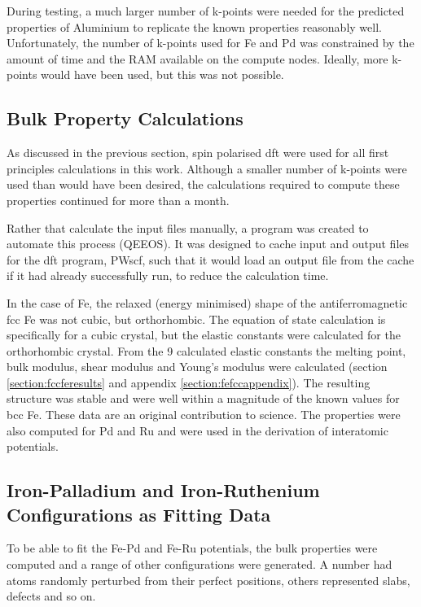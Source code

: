 During testing, a much larger number of k-points were needed for the predicted properties of Aluminium to replicate the known properties reasonably well.  Unfortunately, the number of k-points used for Fe and Pd was constrained by the amount of time and the RAM available on the compute nodes.  Ideally, more k-points would have been used, but this was not possible.


\subsection{Bulk Property Calculations}

As discussed in the previous section, spin polarised \acrshort{dft} were used for all first principles calculations in this work.  Although a smaller number of k-points were used than would have been desired, the calculations required to compute these properties continued for more than a month.

Rather that calculate the input files manually, a program was created to automate this process (QEEOS).  It was designed to cache input and output files for the \acrshort{dft} program, PWscf, such that it would load an output file from the cache if it had already successfully run, to reduce the calculation time.

In the case of Fe, the relaxed (energy minimised) shape of the antiferromagnetic \acrshort{fcc} Fe was not cubic, but orthorhombic.  The equation of state calculation is specifically for a cubic crystal, but the elastic constants were calculated for the orthorhombic crystal.  From the 9 calculated elastic constants the melting point, bulk modulus, shear modulus and Young's modulus were calculated (section \ref{section:fccferesults} and appendix \ref{section:fefccappendix}).  The resulting structure was stable and were well within a magnitude of the known values for \acrshort{bcc} Fe.  These data are an original contribution to science.  The properties were also computed for Pd and Ru and were used in the derivation of interatomic potentials.


\subsection{Iron-Palladium and Iron-Ruthenium Configurations as Fitting Data}

To be able to fit the Fe-Pd and Fe-Ru potentials, the bulk properties were computed and a range of other configurations were generated.  A number had atoms randomly perturbed from their perfect positions, others represented slabs, defects and so on.

